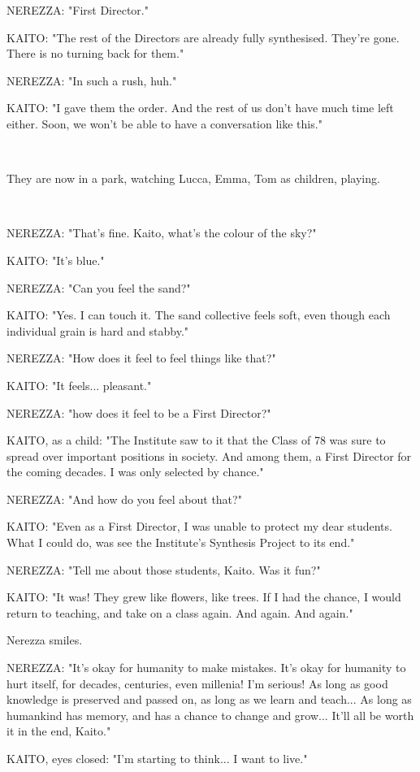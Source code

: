 \documentclass[11pt]{article}
\begin{document}
NEREZZA: "First Director."

KAITO: "The rest of the Directors are already fully synthesised. 
They're gone.
There is no turning back for them."

NEREZZA: "In such a rush, huh."

KAITO: "I gave them the order.
And the rest of us don't have much time left either.
Soon, we won't be able to have a conversation like this."

\ 

They are now in a park, watching Lucca, Emma, Tom as children, playing.

\ 

NEREZZA: "That's fine.
Kaito, what's the colour of the sky?"

KAITO: "It's blue."

NEREZZA: "Can you feel the sand?"

KAITO: "Yes. I can touch it.
The sand collective feels soft, even though each individual grain is hard and stabby."

NEREZZA: "How does it feel to feel things like that?"

KAITO: "It feels... pleasant."

NEREZZA: "how does it feel to be a First Director?"

KAITO, as a child: "The Institute saw to it that the Class of 78 was sure to spread over important positions in society. 
And among them, a First Director for the coming decades.
I was only selected by chance."

NEREZZA: "And how do you feel about that?"

KAITO: "Even as a First Director, I was unable to protect my dear students.
What I could do, was see the Institute's Synthesis Project to its end."

NEREZZA: "Tell me about those students, Kaito. Was it fun?"

KAITO: "It was! They grew like flowers, like trees.
If I had the chance, I would return to teaching, and take on a class again.
And again.
And again."

Nerezza smiles.

NEREZZA: "It's okay for humanity to make mistakes.
It's okay for humanity to hurt itself, for decades, centuries, even millenia!
I'm serious!
As long as good knowledge is preserved and passed on, as long as we learn and teach...
As long as humankind has memory, and has a chance to change and grow...
It'll all be worth it in the end, Kaito."

KAITO, eyes closed: "I'm starting to think...
I want to live."
\end{document}
